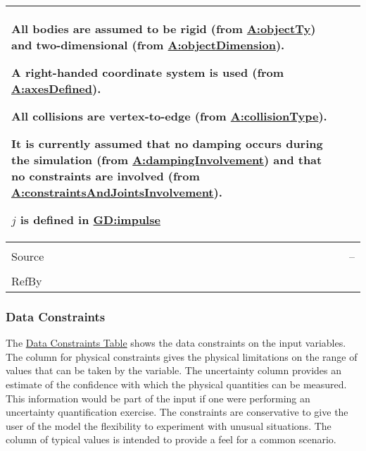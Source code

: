 \documentclass[12pt]{article}
\begin{document}
\begin{minipage}{\textwidth}
\begin{tabular}{>{\raggedright}p{}>{\raggedright\arraybackslash}p{}}
        All bodies are assumed to be rigid (from \hyperref[assumpOT]{A:objectTy}) and two-dimensional (from \hyperref[assumpOD]{A:objectDimension}).
        
        A right-handed coordinate system is used (from \hyperref[assumpAD]{A:axesDefined}).
        
        All collisions are vertex-to-edge (from \hyperref[assumpCT]{A:collisionType}).
        
        It is currently assumed that no damping occurs during the simulation (from \hyperref[assumpDI]{A:dampingInvolvement}) and that no constraints are involved (from \hyperref[assumpCAJI]{A:constraintsAndJointsInvolvement}).
        
        $j$ is defined in \hyperref[GD:impulse]{GD:impulse}
        
\\ \midrule \\
Source & --
         
\\ \midrule \\
RefBy & 
\\ \bottomrule
\end{tabular}
\end{minipage}

\subsubsection{Data Constraints}
\label{Sec:DataConstraints}
The \hyperref[Table:InDataConstraints]{Data Constraints Table} shows the data constraints on the input variables. The column for physical constraints gives the physical limitations on the range of values that can be taken by the variable. The uncertainty column provides an estimate of the confidence with which the physical quantities can be measured. This information would be part of the input if one were performing an uncertainty quantification exercise. The constraints are conservative to give the user of the model the flexibility to experiment with unusual situations. The column of typical values is intended to provide a feel for a common scenario.
\end{document}
